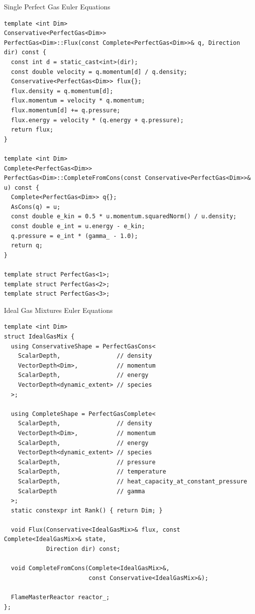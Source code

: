 \documentclass[ucs,9pt]{beamer}
\begin{document}
\begin{frame}[fragile]{Single Perfect Gas Euler Equations}
\begin{lstlisting}
template <int Dim>
Conservative<PerfectGas<Dim>> 
PerfectGas<Dim>::Flux(const Complete<PerfectGas<Dim>>& q, Direction dir) const {
  const int d = static_cast<int>(dir);
  const double velocity = q.momentum[d] / q.density;
  Conservative<PerfectGas<Dim>> flux{};
  flux.density = q.momentum[d];
  flux.momentum = velocity * q.momentum;
  flux.momentum[d] += q.pressure;
  flux.energy = velocity * (q.energy + q.pressure);
  return flux;
}

template <int Dim>
Complete<PerfectGas<Dim>> 
PerfectGas<Dim>::CompleteFromCons(const Conservative<PerfectGas<Dim>>& u) const {
  Complete<PerfectGas<Dim>> q{};
  AsCons(q) = u;
  const double e_kin = 0.5 * u.momentum.squaredNorm() / u.density;
  const double e_int = u.energy - e_kin;
  q.pressure = e_int * (gamma_ - 1.0);
  return q;
}

template struct PerfectGas<1>;
template struct PerfectGas<2>;
template struct PerfectGas<3>;
\end{lstlisting}
\end{frame}

\begin{frame}[fragile]{Ideal Gas Mixtures Euler Equations}
\begin{lstlisting}
template <int Dim>
struct IdealGasMix {
  using ConservativeShape = PerfectGasCons<
    ScalarDepth,                // density
    VectorDepth<Dim>,           // momentum
    ScalarDepth,                // energy
    VectorDepth<dynamic_extent> // species
  >;

  using CompleteShape = PerfectGasComplete<
    ScalarDepth,                // density
    VectorDepth<Dim>,           // momentum
    ScalarDepth,                // energy
    VectorDepth<dynamic_extent> // species
    ScalarDepth,                // pressure
    ScalarDepth,                // temperature
    ScalarDepth,                // heat_capacity_at_constant_pressure
    ScalarDepth                 // gamma
  >;
  static constexpr int Rank() { return Dim; }

  void Flux(Conservative<IdealGasMix>& flux, const Complete<IdealGasMix>& state,
            Direction dir) const;

  void CompleteFromCons(Complete<IdealGasMix>&,
                        const Conservative<IdealGasMix>&);

  FlameMasterReactor reactor_;
};
\end{lstlisting}
\end{frame}
\end{document}
